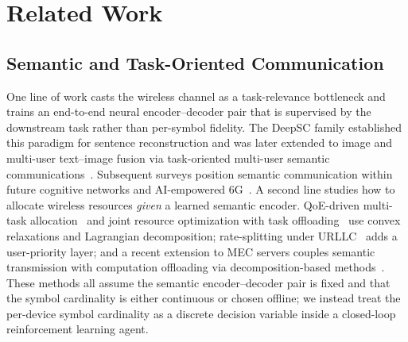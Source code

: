 \section{Related Work}\label{sec:related}

\subsection{Semantic and Task-Oriented Communication}\label{subsec:rw:sem}
One line of work casts the wireless channel as a task-relevance bottleneck
and trains an end-to-end neural encoder--decoder pair that is supervised by
the downstream task rather than per-symbol fidelity. The DeepSC family
established this paradigm for sentence reconstruction
\cite{xie2021deepsc} and was later extended to image and multi-user
text--image fusion via task-oriented multi-user semantic
communications~\cite{xie2022taskoriented}. Subsequent surveys position
semantic communication within future cognitive networks and AI-empowered
6G~\cite{qin2024aiempowered,qin2024semanticnet}. A second line studies
how to allocate wireless resources \emph{given} a learned semantic encoder.
QoE-driven multi-task allocation~\cite{yan2024qoesc} and joint resource
optimization with task offloading~\cite{ji2024semawaretask} use convex
relaxations and Lagrangian decomposition; rate-splitting under
URLLC~\cite{zeng2024urllc} adds a user-priority layer; and a recent
extension to MEC servers couples semantic transmission with computation
offloading via decomposition-based methods~\cite{zheng2025jointsem}. These
methods all assume the semantic encoder--decoder pair is fixed and that
the symbol cardinality is either continuous or chosen offline; we instead
treat the per-device symbol cardinality as a discrete decision variable
inside a closed-loop reinforcement learning agent.

